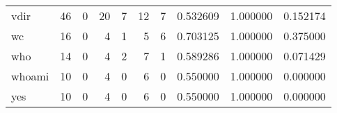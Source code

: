 \begin{tabular}{lrrrrrrrrr}
vdir      &                                       46 &                                                  0 &                                                 20 &                                                  7 &                                                 12 &                                                  7 &                                           0.532609 &                               1.000000 &                             0.152174 \\
wc        &                                       16 &                                                  0 &                                                  4 &                                                  1 &                                                  5 &                                                  6 &                                           0.703125 &                               1.000000 &                             0.375000 \\
who       &                                       14 &                                                  0 &                                                  4 &                                                  2 &                                                  7 &                                                  1 &                                           0.589286 &                               1.000000 &                             0.071429 \\
whoami    &                                       10 &                                                  0 &                                                  4 &                                                  0 &                                                  6 &                                                  0 &                                           0.550000 &                               1.000000 &                             0.000000 \\
yes       &                                       10 &                                                  0 &                                                  4 &                                                  0 &                                                  6 &                                                  0 &                                           0.550000 &                               1.000000 &                             0.000000 \\
\bottomrule
\end{tabular}
